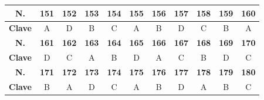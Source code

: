 \begin{center}
\begin{tabular}{|c|c|c|c|c|c|c|c|c|c|c|}
\hline
\textbf{N.} & \textbf{151} & \textbf{152} & \textbf{153} & \textbf{154} & \textbf{155} & \textbf{156} & \textbf{157} & \textbf{158} & \textbf{159} & \textbf{160} \\
\hline
\textbf{Clave} & A & D & B & C & A & B & D & C & B & A \\
\hline
\textbf{N.} & \textbf{161} & \textbf{162} & \textbf{163} & \textbf{164} & \textbf{165} & \textbf{166} & \textbf{167} & \textbf{168} & \textbf{169} & \textbf{170} \\
\hline
\textbf{Clave} & D & C & A & B & D & A & C & B & D & C \\
\hline
\textbf{N.} & \textbf{171} & \textbf{172} & \textbf{173} & \textbf{174} & \textbf{175} & \textbf{176} & \textbf{177} & \textbf{178} & \textbf{179} & \textbf{180} \\
\hline
\textbf{Clave} & B & A & D & C & A & B & D & A & B & C \\
\hline
\end{tabular}
\end{center}
